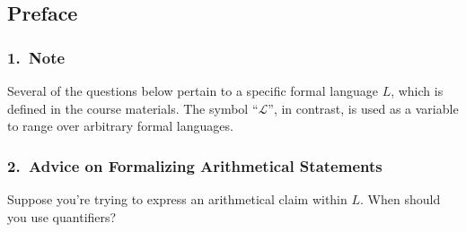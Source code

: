 \documentclass[12pt,a4paper]{article}
\begin{document}




\subsection*{Preface}

\subsubsection*{1.~Note}

Several of the questions below pertain to a specific formal language $L$, which is defined in the course materials. The symbol ``$\mathcal{L}$'', in contrast, is used as a variable to range over arbitrary formal languages.

\subsubsection*{2.~Advice on Formalizing Arithmetical Statements}

Suppose you're trying to express an arithmetical claim within $L$. When should you use quantifiers? 
\end{document}
